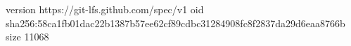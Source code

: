 version https://git-lfs.github.com/spec/v1
oid sha256:58ca1fb01dac22b1387b57ee62cf89cdbc31284908fc8f2837da29d6eaa8766b
size 11068
